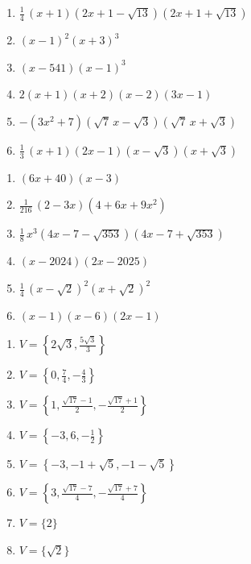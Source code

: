 \documentclass{ximera}
\begin{document}
\begin{oplossing} 
\begin{enumerate}
\item
\hyperlink{oef4.4}{$\frac{1}{4}\,(x+1)(2x+1-\sqrt{13})(2x+1+\sqrt{13})$}
\item
\hyperlink{oef4.4}{$(x-1)^2(x+3)^3$}
\item
\hyperlink{oef4.4}{$(x-541)(x-1)^3$}
\item
\hyperlink{oef4.4}{$2(x+1)(x+2)(x-2)(3x-1)$}
\item
\hyperlink{oef4.4}{$-(3x^2+7)(\sqrt{7}\,x-\sqrt{3})(\sqrt{7}\,x+\sqrt{3})$}
\item
\hyperlink{oef4.4}{$\frac{1}{3}\,(x+1)(2x-1)(x-\sqrt{3})(x+\sqrt{3})$}
\end{enumerate}
\end{oplossing} 

\begin{oplossing} 
\begin{enumerate}
\item
\hyperlink{oef4.5}{$(6x+40)(x-3)$}
\item
\hyperlink{oef4.5}{$\frac{1}{216}\,(2-3x)(4+6x+9x^2)$}
\item
\hyperlink{oef4.5}{$\frac{1}{8}\,x^3(4x-7-\sqrt{353})(4x-7+\sqrt{353})$}
\item
\hyperlink{oef4.5}{$(x-2024)(2x-2025)$}
\item
\hyperlink{oef4.5}{$\frac{1}{4}\,(x-\sqrt{2})^2(x+\sqrt{2})^2$}
\item
\hyperlink{oef4.5}{$(x-1)(x-6)(2x-1)$}
\end{enumerate}
\end{oplossing} 

\begin{oplossing} 
\begin{enumerate}
\item
\hyperlink{oef4.6}{$V = \left\{ 2\sqrt{3},\frac{5\sqrt{3}}{3} \right\}$}
\item
\hyperlink{oef4.6}{$V = \left\{0,\frac{7}{4},-\frac{4}{3}\right\}$}
\item
\hyperlink{oef4.6}{$V = \left\{ 1, \frac{\sqrt{17}-1}{2}, -\frac{\sqrt{17}+1}{2} \right\}$}
\item
\hyperlink{oef4.6}{$V = \left\{-3,6,-\frac{1}{2}\right\}$}
\item
\hyperlink{oef4.6}{$V = \left\{-3,-1+\sqrt{5}, -1-\sqrt{5}\right\}$}
\item
\hyperlink{oef4.6}{$V = \left\{ 3, \frac{\sqrt{17}-7}{4}, -\frac{\sqrt{17}+7}{4} \right\}$}
\item
\hyperlink{oef4.6}{$V = \{ 2 \}$}
\item
\hyperlink{oef4.6}{$V = \{\sqrt{2}\}$}
\end{enumerate}
\end{oplossing} 
\end{document}
